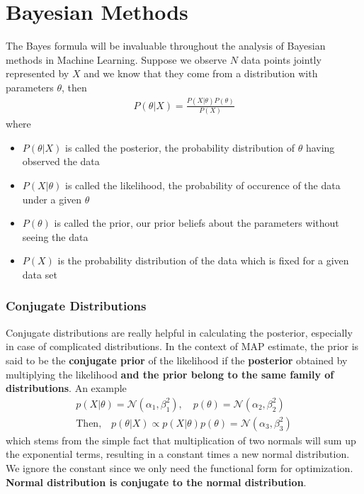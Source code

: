 \documentclass[../statistical_learning_notes.tex]{subfiles}
\begin{document}
\chapter{Bayesian Methods}
The Bayes formula will be invaluable throughout the analysis of Bayesian methods in Machine Learning. Suppose we observe $N$ data points jointly represented by $X$ and we know that they come from a distribution with parameters $\theta$, then
\begin{align*}
    P(\theta|X) = \frac{P(X|\theta)P(\theta)}{P(X)}
\end{align*}
where
\begin{itemize}
    \item $P(\theta|X)$ is called the posterior, the probability distribution of $\theta$ having observed the data
    \item $P(X|\theta)$ is called the likelihood, the probability of occurence of the data under a given $\theta$
    \item $P(\theta)$ is called the prior, our prior beliefs about the parameters without seeing the data
    \item $P(X)$ is the probability distribution of the data which is fixed for a given data set
\end{itemize}





\subsection{Conjugate Distributions}
Conjugate distributions are really helpful in calculating the posterior, especially in case of complicated distributions. In the context of MAP estimate, the prior is said to be the \textbf{conjugate prior} of the likelihood if the \textbf{posterior} obtained by multiplying the likelihood \textbf{and the prior belong to the same family of distributions}. An example
\begin{gather*}
    p(X|\theta) = \mathcal{N}(\alpha_{1}, \beta_{1}^{2}), \quad p(\theta) = \mathcal{N}(\alpha_{2}, \beta_{2}^{2})\\
    \text{Then,} \quad p(\theta|X) \propto p(X|\theta)p(\theta) = \mathcal{N}(\alpha_{3}, \beta_{3}^{2})
\end{gather*}
which stems from the simple fact that multiplication of two normals will sum up the exponential terms, resulting in a constant times a new normal distribution. We ignore the constant since we only need the functional form for optimization.\newline
\textbf{Normal distribution is conjugate to the normal distribution}.
\end{document}
